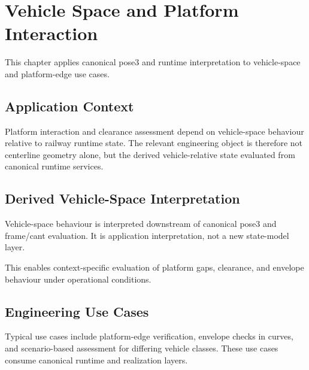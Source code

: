 
\chapter{Vehicle Space and Platform Interaction}

\label{chap:applications-vehicle-space-platform}

This chapter applies canonical pose3 and runtime interpretation to
vehicle-space and platform-edge use cases.

\section{Application Context}

Platform interaction and clearance assessment depend on vehicle-space
behaviour relative to railway runtime state. The relevant engineering
object is therefore not centerline geometry alone, but the derived
vehicle-relative state evaluated from canonical runtime services.

\section{Derived Vehicle-Space Interpretation}

Vehicle-space behaviour is interpreted downstream of canonical pose3 and
frame/cant evaluation. It is application interpretation, not a new
state-model layer.

This enables context-specific evaluation of platform gaps, clearance,
and envelope behaviour under operational conditions.

\section{Engineering Use Cases}

Typical use cases include platform-edge verification, envelope checks in
curves, and scenario-based assessment for differing vehicle classes.
These use cases consume canonical runtime and realization layers.

